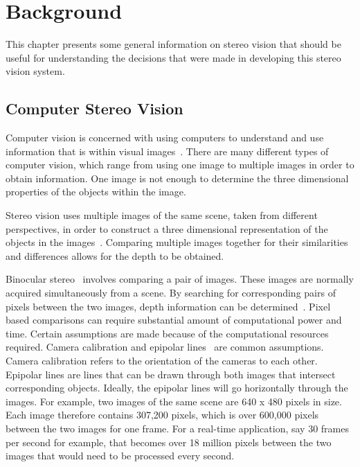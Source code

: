 \chapter{Background}
\label{bckgrnd}

This chapter presents some general information on stereo vision that should be useful for understanding the decisions that were made in developing this stereo vision system.

\section{Computer Stereo Vision}

Computer vision is concerned with using computers to understand and use information that is within visual images~\cite{computerVision}. There are many different types of computer vision, which range from using one image to multiple images in order to obtain information. One image is not enough to determine the three dimensional properties of the objects within the image.

Stereo vision uses multiple images of the same scene, taken from different perspectives, in order to construct a three dimensional representation of the objects in the images~\cite{stereoVision}. Comparing multiple images together for their similarities and differences allows for the depth to be obtained.

Binocular stereo~\cite{binocularStereo} involves comparing a pair of images. These images are normally acquired simultaneously from a scene. By searching for corresponding pairs of pixels between the two images, depth information can be determined~\cite{binocularStereo}. Pixel based comparisons can require substantial amount of computational power and time. Certain assumptions are made because of the computational resources required. Camera calibration and epipolar lines~\cite{binocularStereo} are common assumptions. Camera calibration refers to the orientation of the cameras to each other. Epipolar lines are lines that can be drawn through both images that intersect corresponding objects. Ideally, the epipolar lines will go horizontally through the images. For example, two images of the same scene are 640 x 480 pixels in size. Each image therefore contains 307,200 pixels, which is over 600,000 pixels between the two images for one frame. For a real-time application, say 30 frames per second for example, that becomes over 18 million pixels between the two images that would need to be processed every second.

